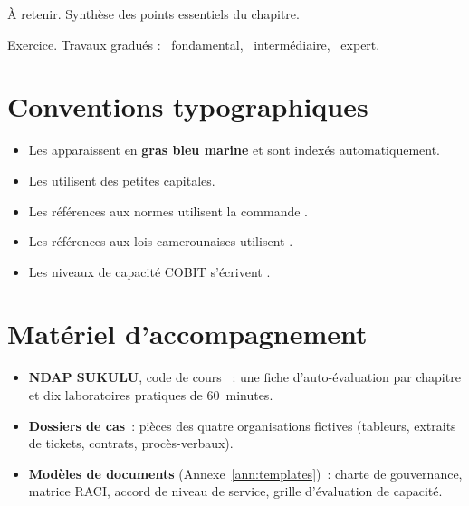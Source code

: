 \begin{boxresume}
À retenir. Synthèse des points essentiels du chapitre.
\end{boxresume}

\begin{boxexo}
Exercice. Travaux gradués : \niveaubase\ fondamental,
\niveaumoyen\ intermédiaire, \niveauexpert\ expert.
\end{boxexo}

\section*{Conventions typographiques}

\begin{itemize}
    \item Les  apparaissent en \textbf{gras bleu marine}
          et sont indexés automatiquement.
    \item Les  utilisent des petites capitales.
    \item Les références aux normes utilisent la commande .
    \item Les références aux lois camerounaises utilisent .
    \item Les niveaux de capacité COBIT s'écrivent .
\end{itemize}

\section*{Matériel d'accompagnement}

\begin{itemize}
    \item \textbf{NDAP SUKULU}, code de cours \codeUE~: une fiche
          d'auto-évaluation par chapitre et dix laboratoires pratiques de
          60~minutes.
    \item \textbf{Dossiers de cas}~: pièces des quatre organisations fictives
          (tableurs, extraits de tickets, contrats, procès-verbaux).
    \item \textbf{Modèles de documents} (Annexe~\ref{ann:templates})~: charte de gouvernance,
          matrice RACI, accord de niveau de service, grille d'évaluation de
          capacité.
\end{itemize}
